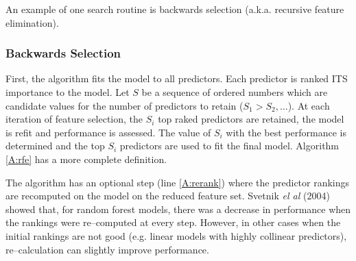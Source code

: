 \documentclass[12pt]{article}
\begin{document}
An example of one search routine is backwards selection (a.k.a. recursive feature elimination). 

\subsubsection{Backwards Selection}

First, the algorithm fits the model to all predictors. Each predictor is ranked ITS importance to the model. Let $S$ be a sequence of ordered numbers which are candidate values for the number of predictors to retain ($S_1 > S_2, \ldots$). At each iteration of feature selection, the $S_i$ top raked predictors are retained, the model is refit and performance is assessed. The value of $S_i$ with the best performance is determined and the top $S_i$ predictors are used to fit the final model. Algorithm \ref{A:rfe} has a more complete definition.

The algorithm has an optional step (line \ref{A:rerank}) where the predictor rankings are recomputed on the model on the reduced feature set. Svetnik {\it el al} (2004) showed that, for random forest models, there was a decrease in performance when the rankings were re--computed at every step. However, in other cases when the initial rankings are not good (e.g. linear models with highly collinear predictors), re--calculation can slightly improve performance.
\end{document}

